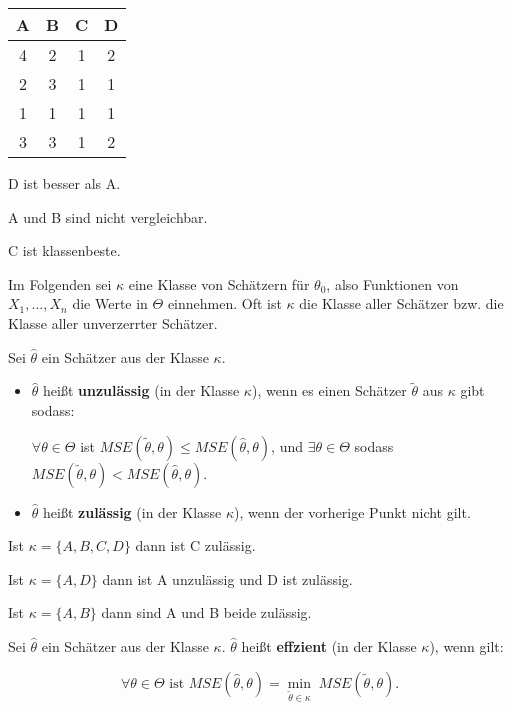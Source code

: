 \documentclass{tstextbook}
\begin{document}
\begin{example}

\begin{tabular}{|cccc|}
         \hline
         A & B & C & D \\
         \hline
         4 & 2 & 1 & 2 \\
         2 & 3 & 1 & 1 \\
         1 & 1 & 1 & 1 \\
         3 & 3 & 1 & 2 \\
         \hline
\end{tabular}
\vspace{0.5cm}

	
	D ist besser als A.
	
	A und B sind nicht vergleichbar.
	
	C ist klassenbeste.
	
\end{example}

Im Folgenden sei $ \kappa $ eine Klasse von Schätzern für $\theta_0 $, also Funktionen von $X_1,...,X_n $ die Werte in $ \Theta $ einnehmen. Oft ist $\kappa$ die Klasse aller Schätzer bzw. die Klasse aller unverzerrter Schätzer. 

\begin{definition}
	Sei $ \hat{\theta} $ ein Schätzer aus der Klasse $\kappa$. 
	\begin{itemize}
		\item $\hat{\theta}$ heißt \textbf{unzulässig}  (in der Klasse $\kappa$), wenn es einen Schätzer $\tilde{\theta}$ aus $\kappa$ gibt sodass:
		
		 $\forall\theta\in\Theta$ ist $MSE(\tilde{\theta}, \theta )\le MSE(\hat{\theta}, \theta) $, und $ \exists\theta\in\Theta$ sodass $MSE(\tilde{\theta}, \theta) < MSE(\hat{\theta}, \theta) $.
		\item $ \hat{\theta} $ heißt \textbf{zulässig} (in der Klasse $\kappa$), wenn der vorherige Punkt nicht gilt.
	\end{itemize}
\end{definition}

Ist $\kappa= \{ A,B,C,D \}$ dann ist C zulässig.

Ist $\kappa= \{ A,D \}$ dann ist A unzulässig und D ist zulässig.

Ist $\kappa= \{ A,B \}$ dann sind A und B beide zulässig.

\begin{definition}
	Sei $ \hat{\theta} $ ein Schätzer aus der Klasse $\kappa$. $\hat{\theta}$ heißt \textbf{effzient}  (in der Klasse $\kappa$), wenn gilt:
	
	\[ \forall\theta \in\Theta \text{ ist } MSE\left(\hat{\theta}, \theta\right) = \underset{\tilde{\theta}\in\kappa}{\min}\; MSE\left(\tilde{\theta},\theta\right). \] 
\end{definition}
\end{document}
